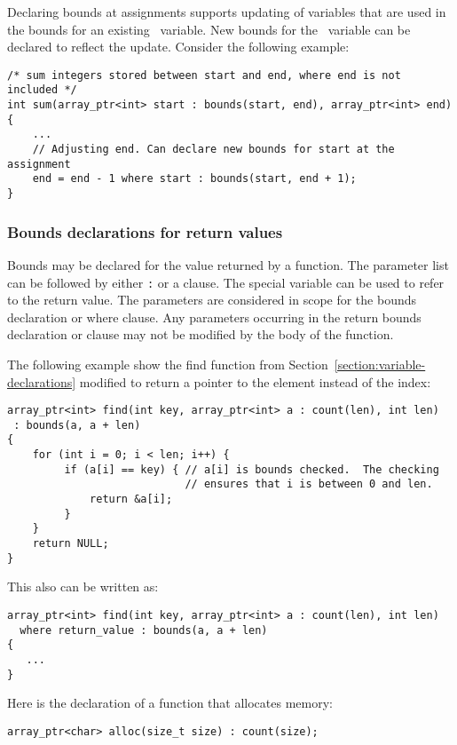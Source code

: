 Declaring bounds at assignments supports updating of variables that are
used in the bounds for an existing \arrayptr\ variable. New
bounds for the \arrayptr\ variable can be declared to reflect
the update. Consider the following example:

\begin{verbatim}
/* sum integers stored between start and end, where end is not included */
int sum(array_ptr<int> start : bounds(start, end), array_ptr<int> end)
{ 
    ...
    // Adjusting end. Can declare new bounds for start at the assignment
    end = end - 1 where start : bounds(start, end + 1);
}
\end{verbatim}

\subsubsection{Bounds declarations for return values}

Bounds may be declared for the value returned by a function. The
parameter list can be followed by either \texttt{:}  or
a  clause. The special variable  can
be used to refer to the return value. The parameters are considered in
scope for the bounds declaration or where clause. Any parameters
occurring in the return bounds declaration or  clause may
not be modified by the body of the function.

The following example show the find function from
Section~\ref{section:variable-declarations} modified
to return a pointer to the element instead of the index:

\begin{verbatim}
array_ptr<int> find(int key, array_ptr<int> a : count(len), int len)
 : bounds(a, a + len)
{
    for (int i = 0; i < len; i++) {
         if (a[i] == key) { // a[i] is bounds checked.  The checking
                            // ensures that i is between 0 and len.
             return &a[i];
         }
    }
    return NULL;
}
\end{verbatim}

This also can be written as:

\begin{verbatim}
array_ptr<int> find(int key, array_ptr<int> a : count(len), int len)
  where return_value : bounds(a, a + len)
{
   ...
}
\end{verbatim}
Here is the declaration of a function that allocates memory:

\begin{verbatim}
array_ptr<char> alloc(size_t size) : count(size);
\end{verbatim}

